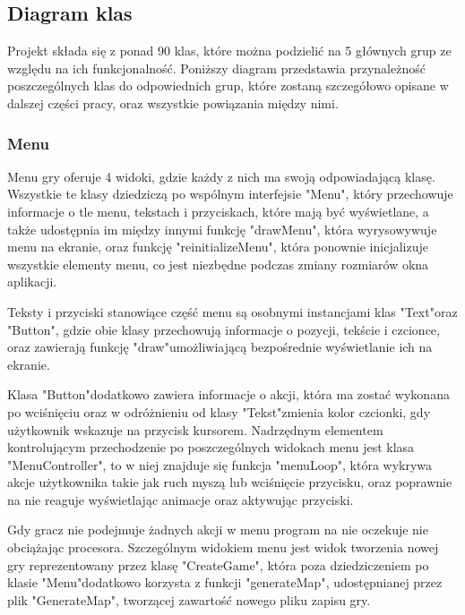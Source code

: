 \documentclass{article}
\begin{document}
\newpage
\subsection{Diagram klas}
Projekt składa się z ponad 90 klas, które można podzielić na 5 głównych grup ze względu na ich funkcjonalność. Poniższy diagram przedstawia przynależność poszczególnych klas do odpowiednich grup, które zostaną szczegółowo opisane w dalszej części pracy, oraz wszystkie powiązania między nimi. 

\begin{center}
     
\end{center}

\subsubsection{Menu}
Menu gry oferuje 4 widoki, gdzie każdy z nich ma swoją odpowiadającą klasę. Wszystkie te klasy dziedziczą po wspólnym interfejsie "Menu", który przechowuje informacje o tle menu, tekstach i przyciskach, które mają być wyświetlane, a także udostępnia im między innymi funkcję "drawMenu", która wyrysowywuje menu na ekranie, oraz funkcję "reinitializeMenu", która ponownie inicjalizuje wszystkie elementy menu, co jest niezbędne podczas zmiany rozmiarów okna aplikacji.

Teksty i przyciski stanowiące część menu są osobnymi instancjami klas "Text"\space oraz "Button", gdzie obie klasy przechowują informacje o pozycji, tekście i czcionce, oraz zawierają funkcję "draw"\space umożliwiającą bezpośrednie wyświetlanie ich na ekranie.

Klasa "Button"\space dodatkowo zawiera informacje o akcji, która ma zostać wykonana po wciśnięciu oraz w odróżnieniu od klasy "Tekst"\space zmienia kolor czcionki, gdy użytkownik wskazuje na przycisk kursorem. Nadrzędnym elementem kontrolującym przechodzenie po poszczególnych widokach menu jest klasa "MenuController", to w niej znajduje się funkcja "menuLoop", która wykrywa akcje użytkownika takie jak ruch myszą lub wciśnięcie przycisku, oraz poprawnie na nie reaguje wyświetlając animacje oraz aktywując przyciski.

Gdy gracz nie podejmuje żadnych akcji w menu program na nie oczekuje nie obciążając procesora. Szczególnym widokiem menu jest widok tworzenia nowej gry reprezentowany przez klasę "CreateGame", która poza dziedziczeniem po klasie "Menu"\space dodatkowo korzysta z funkcji "generateMap", udostępnianej przez plik "GenerateMap", tworzącej zawartość nowego pliku zapisu gry.
\end{document}
